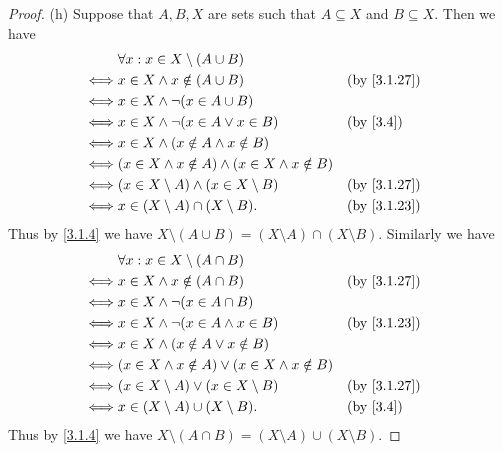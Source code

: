 \begin{proof}{(h)}
  Suppose that \(A, B, X\) are sets such that \(A \subseteq X\) and \(B \subseteq X\).
  Then we have
  \begin{align*}
         & \forall x : x \in X \setminus (A \cup B)                                                \\
    \iff & x \in X \land x \notin (A \cup B)                           &  & \by{3.1.27}            \\
    \iff & x \in X \land \lnot (x \in A \cup B)                                                    \\
    \iff & x \in X \land \lnot (x \in A \lor x \in B)                  &  & \text{(by \cref{3.4})} \\
    \iff & x \in X \land (x \notin A \land x \notin B)                                             \\
    \iff & (x \in X \land x \notin A) \land (x \in X \land x \notin B)                             \\
    \iff & (x \in X \setminus A) \land (x \in X \setminus B)           &  & \by{3.1.27}            \\
    \iff & x \in (X \setminus A) \cap (X \setminus B).                 &  & \by{3.1.23}
  \end{align*}
  Thus by \cref{3.1.4} we have \(X \setminus (A \cup B) = (X \setminus A) \cap (X \setminus B)\).
  Similarly we have
  \begin{align*}
         & \forall x : x \in X \setminus (A \cap B)                                               \\
    \iff & x \in X \land x \notin (A \cap B)                          &  & \by{3.1.27}            \\
    \iff & x \in X \land \lnot (x \in A \cap B)                                                   \\
    \iff & x \in X \land \lnot (x \in A \land x \in B)                &  & \by{3.1.23}            \\
    \iff & x \in X \land (x \notin A \lor x \notin B)                                             \\
    \iff & (x \in X \land x \notin A) \lor (x \in X \land x \notin B)                             \\
    \iff & (x \in X \setminus A) \lor (x \in X \setminus B)           &  & \by{3.1.27}            \\
    \iff & x \in (X \setminus A) \cup (X \setminus B).                &  & \text{(by \cref{3.4})}
  \end{align*}
  Thus by \cref{3.1.4} we have \(X \setminus (A \cap B) = (X \setminus A) \cup (X \setminus B)\).
\end{proof}

